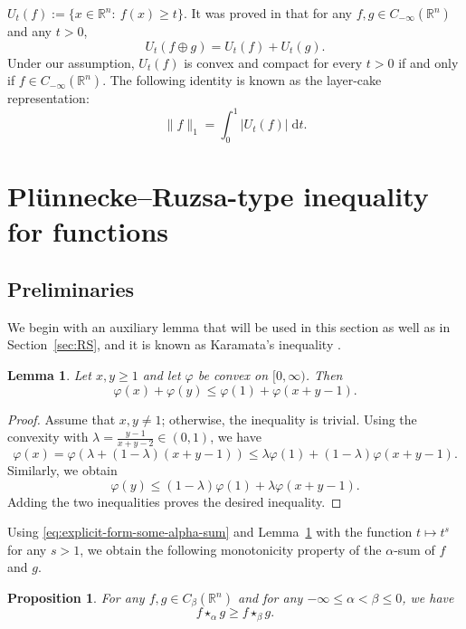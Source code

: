 \documentclass[11pt]{amsart}
\newcommand{\R}{{\mathbb R}}
\theoremstyle{plain}
\newtheorem{lemma}[theorem]{Lemma}
\newtheorem{prop}[theorem]{Proposition}
\theoremstyle{definition}
\theoremstyle{remark}
\begin{document}
$
    U_t(f):=\{x\in\mathbb{R}^n:\ f(x)\ge t\}.
$
It was proved in \cite[Theorem~8]{MR-12} that for any $f,g\in C_{-\infty}(\mathbb{R}^n)$ and any $t>0$,
\begin{equation} \label{sum-Uf}
    U_t(f \oplus g) = U_t(f) +U_t(g).
\end{equation}
Under our assumption, $U_t(f)$ is convex and compact for every $t >0$ if and only if $f \in C_{-\infty} (\R^n)$.
The following identity is known as the layer-cake representation:
\begin{equation} \label{mix-integral-for}
    \|f\|_1 = \int_0^1 |U_t(f)| \;\mathrm d t.
\end{equation}

\section{Pl\"unnecke--Ruzsa-type inequality for functions} \label{our-main-results}

\subsection{Preliminaries}
We begin with an auxiliary lemma that will be used in this section as well as in Section~\ref{sec:RS}, and it is known as Karamata's inequality \cite{K-32}.

\begin{lemma}
    \label{l:Karamata}
    Let $x,y \geq 1$ and let $\varphi$ be convex on $[0,\infty)$. Then
    \begin{equation}
        \label{eq:Karamata}
        \varphi(x) +\varphi(y) \leq \varphi(1) + \varphi(x+y-1).
    \end{equation}
\end{lemma}

\begin{proof}
    Assume that $x,y \neq 1$; otherwise, the inequality is trivial. Using the convexity with $\lambda = \frac{y- 1}{x+y-2} \in (0,1)$, we have
    \[
        \varphi(x) = \varphi (\lambda  +(1-\lambda)(x+y-1)) \leq \lambda \varphi(1) + (1-\lambda) \varphi(x+y -1).
    \]
    Similarly, we obtain
    \[
        \varphi(y) \leq (1-\lambda) \varphi(1) + \lambda \varphi(x+y -1).
    \]
    Adding the two inequalities proves the desired inequality.
\end{proof}
Using \eqref{eq:explicit-form-some-alpha-sum} and Lemma~\ref{l:Karamata} with the function $t \mapsto t^s$ for any $s >1$, we obtain the following monotonicity property of the $\alpha$-sum of $f$ and $g$.
\begin{prop} \label{prop:monotonicity}
    For any $f,g \in C_{\beta}(\R^n)$ and for any $-\infty\leq\alpha<\beta\leq 0$, we have
    \begin{equation} \label{monotonicity}
        f \star_\alpha g \geq f \star_\beta g.
    \end{equation}
\end{prop}
\end{document}
